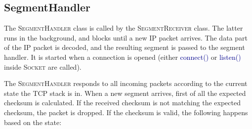 \documentclass{hitec}
\newcommand{\classname}[1]{\textsc{#1}}
\newcommand{\methodname}[1]{\textcolor{darkblue}{#1}}
\begin{document}
\subsection{SegmentHandler}
The \classname{SegmentHandler} class is called by the \classname{SegmentReceiver} class. The latter runs in the background, and blocks until a new IP packet arrives. The data part of the IP packet is decoded, and the resulting segment is passed to the segment handler. It is started when a connection is opened (either \methodname{connect()} or \methodname{listen()} inside \classname{Socket} are called). 

The \classname{SegmentHandler} responds to all incoming packets according to the current state the TCP stack is in. When a new segment arrives, first of all the expected checksum is calculated. If the received checksum is not matching the expected checksum, the packet is dropped. If the checksum is valid, the following happens based on the state:
\end{document}
